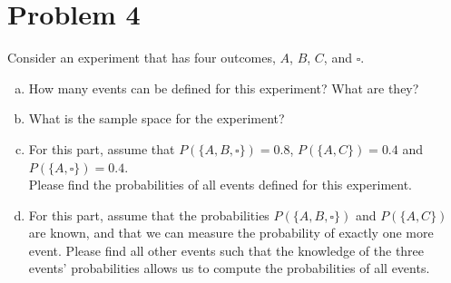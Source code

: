 \section{Problem 4}
Consider an experiment that has four outcomes, $A$, $B$, $C$, and $\square$.

\begin{enumerate}[a.]
	\item How many events can be defined for this experiment? What are they?
	\item  What is the sample space for the experiment?
	\item For this part, assume that $P(\{A, B, \square\}) = 0.8$, $P(\{A, C\}) = 0.4$ and $P(\{A, \square\}) = 0.4$.\\
	Please find the probabilities of all events defined for this experiment.
	\item For this part, assume that the probabilities $P(\{A, B, \square\})$ and $P(\{A, C\})$ are known, and that we can measure the probability of exactly one more event. Please find all other events such that the knowledge of the three events' probabilities allows us to compute the probabilities of all events.
\end{enumerate}

